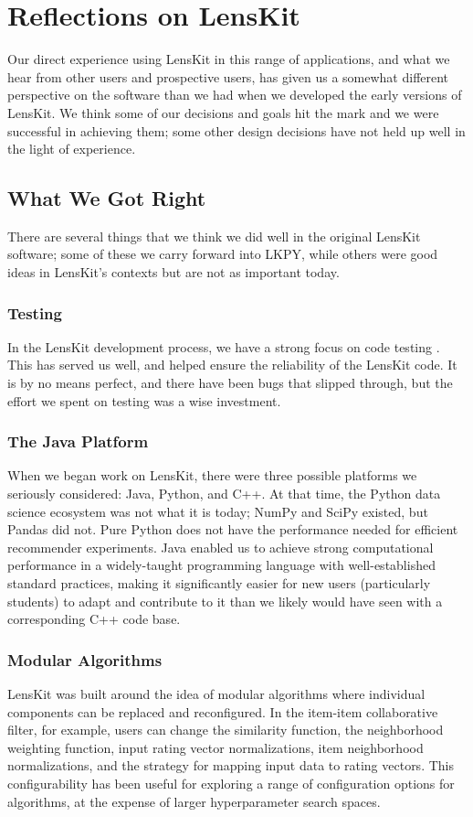 \section{Reflections on LensKit}

Our direct experience using LensKit in this range of applications, and what we hear from other users and prospective users, has given us a somewhat different perspective on the software than we had when we developed the early versions of LensKit.
We think some of our decisions and goals hit the mark and we were successful in achieving them; some other design decisions have not held up well in the light of experience.

\subsection{What We Got Right}

There are several things that we think we did well in the original LensKit software; some of these we carry forward into LKPY, while others were good ideas in LensKit's contexts but are not as important today.

\subsubsection{Testing}
In the LensKit development process, we have a strong focus on code testing \citep{Ekstrand2016-vr}. This has served us well, and helped ensure the reliability of the LensKit code.
It is by no means perfect, and there have been bugs that slipped through, but the effort we spent on testing was a wise investment.

\subsubsection{The Java Platform}
When we began work on LensKit, there were three possible platforms we seriously considered: Java, Python, and C++.
At that time, the Python data science ecosystem was not what it is today; NumPy and SciPy existed, but Pandas did not.
Pure Python does not have the performance needed for efficient recommender experiments.
Java enabled us to achieve strong computational performance in a widely-taught programming language with well-established standard practices, making it significantly easier for new users (particularly students) to adapt and contribute to it than we likely would have seen with a corresponding C++ code base.

\subsubsection{Modular Algorithms}
LensKit was built around the idea of modular algorithms where individual components can be replaced and reconfigured.
In the item-item collaborative filter, for example, users can change the similarity function, the neighborhood weighting function, input rating vector normalizations, item neighborhood normalizations, and the strategy for mapping input data to rating vectors.
This configurability has been useful for exploring a range of configuration options for algorithms, at the expense of larger hyperparameter search spaces.

